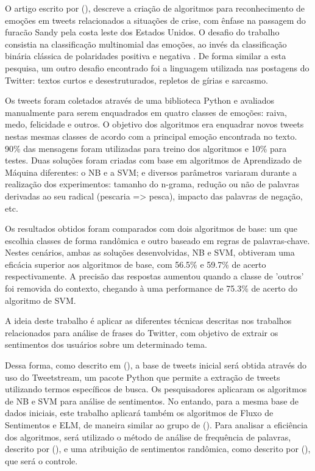 \documentclass[
	12pt,				%
	openright,			%
	oneside,			%
	a4paper,			%
	english,			%
	spanish,			%
	brazil				%
	]{abntex2}
\begin{document}
O artigo escrito por  (\citeyear{article_tweet_crisis}), descreve a criação de algoritmos para reconhecimento de emoções em tweets relacionados a situações de crise, com ênfase na passagem do furacão Sandy pela costa leste dos Estados Unidos. O desafio do trabalho consistia na classificação multinomial das emoções, ao invés da classificação binária clássica de polaridades positiva e negativa \cite{article_sentiment_twitter}. De forma similar a esta pesquisa, um outro desafio encontrado foi a linguagem utilizada nas postagens do Twitter: textos curtos e desestruturados, repletos de gírias e sarcasmo.

Os tweets foram coletados através de uma biblioteca Python e avaliados manualmente para serem enquadrados em quatro classes de emoções: raiva, medo, felicidade e outros. O objetivo dos algoritmos era enquadrar novos tweets nestas mesmas classes de acordo com a principal emoção encontrada no texto. 90\% das mensagens foram utilizadas para treino dos algoritmos e 10\% para testes. Duas soluções foram criadas com base em algoritmos de  Aprendizado de Máquina diferentes: o \gls{NB} e a \gls{SVM}; e diversos parâmetros variaram durante a realização dos experimentos: tamanho do n-grama, redução ou não de palavras derivadas ao seu radical (pescaria => pesca), impacto das palavras de negação, etc. 

Os resultados obtidos foram comparados com dois algoritmos de base: um que escolhia classes de forma randômica e outro baseado em regras de palavras-chave. Nestes cenários, ambas as soluções desenvolvidas, \gls{NB} e \gls{SVM}, obtiveram uma eficácia superior aos algoritmos de base, com 56.5\% e 59.7\% de acerto respectivamente. A precisão das respostas aumentou quando a classe de 'outros' foi removida do contexto, chegando à uma performance de 75.3\% de acerto do algoritmo de \gls{SVM}. 

	A ideia deste trabalho é aplicar as diferentes técnicas descritas nos trabalhos relacionados para análise de frases do Twitter, com objetivo de extrair os sentimentos dos usuários sobre um determinado tema.  

	Dessa forma, como descrito em  (\citeyear{article_tweet_crisis}), a base de tweets inicial será obtida através do uso do Tweetstream, um pacote Python que permite a extração de tweets utilizando termos específicos de busca. Os pesquisadores aplicaram os algoritmos de NB e SVM para análise de sentimentos. No entando, para a mesma base de dados iniciais, este trabalho aplicará também os algoritmos de Fluxo de Sentimentos e ELM, de maneira similar ao grupo de  (\citeyear{article_sentiment_analysis}). Para analisar a eficiência dos algoritmos, será utilizado o método de análise de frequência de palavras, descrito por  (\citeyear{article_Tsugawa2013}), e uma atribuição de sentimentos randômica, como descrito por  (\citeyear{article_tweet_crisis}), que será o controle. 
\end{document}
